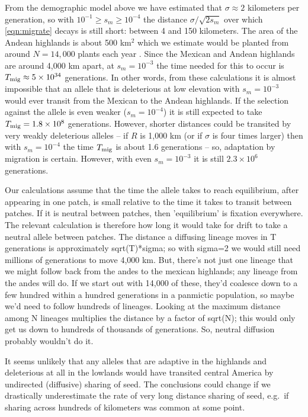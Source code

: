 {{From the demographic model above
we have estimated that $\sigma \approx 2$ kilometers per generation,
so with $10^{-1} \ge s_m \ge 10^{-4}$ the distance $\sigma/\sqrt{2s_m}$ over which \eqref{eqn:migrate} decays 
is still short: between 4 and 150 kilometers.
The area of the Andean highlands is about 500 km$^2$ 
which we estimate would be planted from around $N=14,000$ plants each year .
Since the Mexican and Andean highlands are around 4,000 km apart,
at $s_m=10^{-3}$ the time needed for this to occur is $T_{\text{mig}} \approx 5 \times 10^{34}$ generations.
In other words, from these calculations it is almost impossible that an allele that is deleterious at low elevation with $s_m=10^{-3}$ 
would ever transit from the Mexican to the Andean highlands.
If the selection against the allele is even weaker ($s_m=10^{-4}$) it is still expected to take $T_{\text{mig}} = 1.8 \times 10^8$ generations.
However, shorter distances could be transited by very weakly deleterious alleles --
if $R$ is 1,000 km (or if $\sigma$ is four times larger)
then with $s_m=10^{-4}$ the time $T_{\text{mig}}$ is about 1.6 generations --
so, adaptation by migration is certain.
However, with even $s_m=10^{-3}$ it is still $2.3 \times 10^6$ generations.

Our calculations assume that the time the allele takes to reach equilibrium, after appearing in one patch, is small relative to the time it takes to transit between patches.  If it is neutral between patches, then 'equilibrium' is fixation everywhere.  The relevant calculation is therefore how long it would take for drift to take a neutral allele between patches.  The distance a diffusing lineage moves in T generations is approximately sqrt(T)*sigma; so with sigma=2 we would still need millions of generations to move 4,000 km.  But, there's not just one lineage that we might follow back from the andes to the mexican highlands; any lineage from the andes will do.  If we start out with 14,000 of these, they'd coalesce down to a few hundred within a hundred generations in a panmictic population, so maybe we'd need to follow hundreds of lineages.  Looking at the maximum distance among N lineages multiplies the distance by a factor of sqrt(N); this would only get us down to hundreds of thousands of generations.  So, neutral diffusion probably wouldn't do it.

It seems unlikely that any alleles that are adaptive in the highlands and deleterious at all in the lowlands
would have transited central America by undirected (diffusive) sharing of seed.
The conclusions could change if we drastically underestimate the rate of very long distance sharing of seed,
e.g.\ if sharing across hundreds of kilometers was common at some point.

}}

